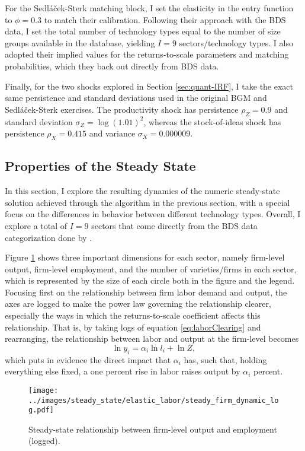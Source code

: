 \documentclass[a4paper,12pt]{article} %
\numberwithin{equation}{section} %
\numberwithin{figure}{section}
\numberwithin{table}{section}
\begin{document}
For the Sedláček-Sterk matching block, I set the elasticity in the entry function to $\phi = 0.3$ to match their 
calibration. Following their approach with the BDS data, I set the total number of technology types equal to the
number of size groups available in the database, yielding $I = 9$ sectors/technology types. I also adopted their
implied values for the returns-to-scale parameters and matching probabilities, which they back out directly from
BDS data. 

Finally, for the two shocks explored in Section \ref{sec:quant-IRF}, I take the exact same persistence and standard deviations used in the 
original BGM and Sedláček-Sterk exercises. The productivity shock has
persistence $\rho_Z =0.9$ and standard deviation $\sigma_Z = \log (1.01)^2$, whereas the stock-of-ideas shock has 
persistence $\rho_X = 0.415$ and variance $\sigma_X = 0.000009$. 

\subsection{Properties of the Steady State}
\label{sec:solution-properties}

In this section, I explore the resulting dynamics of the numeric steady-state solution achieved through the 
algorithm in the previous section, with a special focus on the differences in behavior between different technology types.
Overall, I explore a total of $I = 9$ sectors that come directly from the BDS data 
categorization done by \textcite{sedlavcek2017growth}.

Figure \ref{fig:steady-output-log} shows three important dimensions for each sector, namely firm-level output, firm-level 
employment, and the number 
of varieties/firms in each sector, which is represented by the size of each circle both in the figure and the legend.
Focusing first on the relationship between firm labor demand and output, the axes are logged to make the power law governing the relationship 
clearer, especially the ways in which the returns-to-scale coefficient affects this relationship. That is, by taking logs of equation 
\eqref{eq:laborClearing} and rearranging, the relationship between labor and output at the firm-level becomes
\begin{equation}
  \ln y_i = \alpha_i\ln l_i + \ln Z, \label{eq:laboroutputlog}
\end{equation}
which puts in evidence the direct impact that $\alpha_i$ has, such that, holding 
everything else fixed, a one percent rise in labor raises output by $\alpha_i$ percent.
\begin{figure}[H]
  \centering
  \texttt{[image: ../images/steady\_state/elastic\_labor/steady\_firm\_dynamic\_log.pdf]}
  \caption{Steady-state relationship between firm-level output and employment (logged).}
  \label{fig:steady-output-log}
\end{figure}
\end{document}
